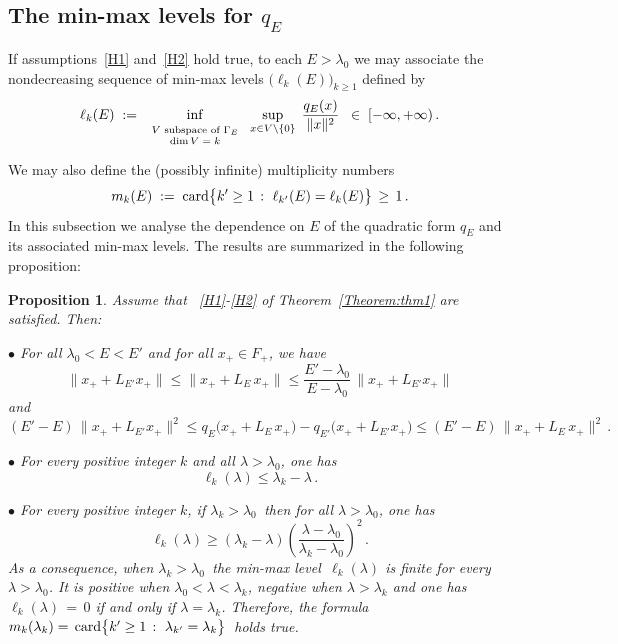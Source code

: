\documentclass[12pt,reqno]{amsart}
\newtheorem{proposition}[theorem]{Proposition}
\newcommand{\be}[1]{\begin{equation}\label{#1}}
\newcommand{\ee}{\end{equation}}
\renewcommand{\(}{\left(}
\renewcommand{\)}{\right)}
\begin{document}
\subsection{The min-max levels for \texorpdfstring{$q_E$}{qE}}\label{dependence}

If assumptions~\eqref{H1} and~\eqref{H2} hold true, to each $E>\lambda_0$ we may associate the nondecreasing sequence of min-max levels $\Big(\ell_k(E)\Big)_{k\geq 1}$ defined by
\be{versionreguliere}
\ell_k(E)\;:=\;\inf_{\scriptstyle\begin{array}{c}\mbox{\scriptsize $V$ subspace of $\Gamma_E$}\\[-4pt] \mbox{\scriptsize dim$\,V=k$}\end{array}}\,\sup_{x\in V\setminus\{0\}}\;\frac{ q_E(x)}{\|x\|^2}\;\;\in\; [-\infty,+\infty)\,.
\ee
We may also define the (possibly infinite) multiplicity numbers
\be{mult}
m_k (E) \; := \;{\rm card} \bigl\{ k' \ge 1 \,:\, \,\ell_{k'} (E) = \ell_k (E) \bigr\} \,\ge \,1\,.
\ee
In this subsection we analyse the dependence on $E$ of the quadratic form $q_E$ and its associated min-max levels. The results are summarized in the following proposition:
\begin{proposition}\label{Prop:QE-comparison}
Assume that {\rm~\eqref{H1}-\eqref{H2}} of Theorem~\ref{Theorem:thm1} are satisfied. Then:

$\bullet$ For all $\lambda_0<E<E'$ and for all $x_+\in F_+$, we have
\be{ineqq1}
\big\|x_++L_{E'}x_+\big\|\le\big\|x_++L_E\,x_+\big\|\le\frac{E'-\lambda_0}{E-\lambda_0}\,\big\|x_++L_{E'}x_+\big\|
\ee
and
\be{ineqq2}
(E'-E)\,\big\|x_++L_{E'}x_+\big\|^2\le q_E\big(x_++L_E\,x_+\big)-q_{E'}\big(x_++L_{E'}x_+\big)\le (E'-E)\,\big\|x_++L_E\,x_+\big\|^2\,.
\ee

$\bullet$ For every positive integer $k$ and all $\lambda>\lambda_0$, one has
\be{above}\ell_k(\lambda)\leq \lambda_k-\lambda\,.\ee

$\bullet$ For every positive integer $k$, if $\lambda_k>\lambda_0\,$ then for all $\lambda>\lambda_0$, one has
\be{below}\ell_k(\lambda)\geq (\lambda_k-\lambda)\left(\frac{\lambda-\lambda_0}{\lambda_k-\lambda_0}\right)^2\,.\ee
As a consequence, when $\lambda_k>\lambda_0\,$ the min-max level $\,\ell_k(\lambda)$ is finite for every $\lambda>\lambda_0$. It is positive when $\lambda_0<\lambda<\lambda_k$, negative when $\lambda>\lambda_k$ and one has $\ell_k ( \lambda) \,= \,0$ if and only if $\lambda=\lambda_k$. Therefore, the formula
$m_k(\lambda_k)=\,{\rm card} \bigl\{ k'
\ge 1 \,:\, \,\lambda_{k'} = \lambda_k \bigr\} \,$ holds true.
\end{proposition}
\end{document}
